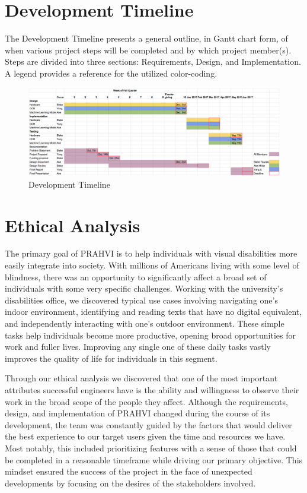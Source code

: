 \chapter{Development Timeline}
The Development Timeline presents a general outline, in Gantt chart form, of when various project steps will be completed and by which project member(s). Steps are divided into three sections: Requirements, Design, and Implementation. A legend provides a reference for the utilized color-coding.
\begin{figure}
	\label{fig:developmentTimeline}
	\centering
	\includegraphics[angle = 90, scale = 0.8]{developmentTimeline.png}
    
    \caption{Development Timeline}
\end{figure}

\chapter{Ethical Analysis}
	The primary goal of PRAHVI is to help individuals with visual disabilities more easily integrate into society. With millions of Americans living with some level of blindness, there was an opportunity to significantly affect a broad set of individuals with some very specific challenges. Working with the university's disabilities office, we discovered typical use cases involving navigating one's indoor environment, identifying and reading texts that have no digital equivalent, and independently interacting with one's outdoor environment. These simple tasks help individuals become more productive, opening broad opportunities for work and fuller lives. Improving any single one of these daily tasks vastly improves the quality of life for individuals in this segment.
	
	Through our ethical analysis we discovered that one of the most important attributes successful engineers have is the ability and willingness to observe their work in the broad scope of the people they affect. Although the requirements, design, and implementation of PRAHVI changed during the course of its development, the team was constantly guided by the factors that would deliver the best experience to our target users given the time and resources we have. Most notably, this included prioritizing features with a sense of those that could be completed in a reasonable timeframe while driving our primary objective. This mindset ensured the success of the project in the face of unexpected developments by focusing on the desires of the stakeholders involved.
	

